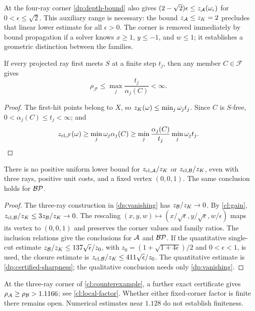 At the four-ray corner \cref{dp:depth-bound} also gives
$(2-\sqrt2)\epsilon\le z_{\mathcal A}(\omega_\epsilon)$ for
$0<\epsilon\le\sqrt2$. This auxiliary range is necessary: the bound
$z_{\mathcal A}\le z_K=2$ precludes that linear lower estimate for all
$\epsilon>0$. The corner is removed immediately by bound propagation
if a solver knows $x\ge1$, $y\le-1$, and $w\le1$; it establishes a
geometric distinction between the families.

\begin{proposition}\label{cl:finite-factor}
If every projected ray first meets $S$ at a finite step $t_j$, then any
member $C\in\mathcal F$ gives
\[
 \rho_{\mathcal F}\le\max_j\frac{t_j}{\alpha_j(C)}<\infty.
\]
\end{proposition}

\begin{proof}
The first-hit points belong to $X$, so
$z_K(\omega)\le\min_j\omega_jt_j$. Since $C$ is $S$-free,
$0<\alpha_j(C)\le t_j<\infty$; and
\[
 z_{\mathrm{cl},\mathcal F}(\omega)
 \ge\min_j\omega_j\alpha_j(C)
 \ge\min_j\frac{\alpha_j(C)}{t_j}\min_j\omega_jt_j.
\]
\end{proof}

\begin{corollary}\label{cl:no-uniform}
There is no positive uniform lower bound for
$z_{\mathrm{cl},\mathcal A}/z_K$ or $z_{\mathrm{cl},\mathcal B}/z_K$, even with
three rays, positive unit costs, and a fixed vertex $(0,0,1)$.
The same conclusion holds for $\mathcal {BP}$.
\end{corollary}

\begin{proof}
The three-ray construction in \cref{dp:vanishing} has
$z_{\mathcal B}/z_K\to0$. By \cref{cl:gain},
$z_{\mathrm{cl},\mathcal B}/z_K\le3z_{\mathcal B}/z_K\to0$.
The rescaling $(x,y,w)\mapsto(x/\sqrt\epsilon,y/\sqrt\epsilon,w/\epsilon)$
maps its vertex to $(0,0,1)$ and preserves the corner values and family
ratios. The inclusion relations give the conclusions for $\mathcal A$ and
$\mathcal {BP}$. If the quantitative single-cut estimate
$z_{\mathcal B}/z_K\le137\sqrt\epsilon/z_0$, with
$z_0=(1+\sqrt{1+4\epsilon})/2$ and $0<\epsilon<1$, is used, the closure
estimate is $z_{\mathrm{cl},\mathcal B}/z_K\le411\sqrt\epsilon/z_0$.
The quantitative estimate is \cref{dp:certified-sharpness};
the qualitative conclusion needs only \cref{dp:vanishing}.
\end{proof}

At the three-ray corner of \cref{cl:counterexample}, a further exact
certificate gives $\rho_{\mathcal A}\ge\rho_{\mathcal B}>1.1166$;
see \cref{cl:local-factor}. Whether either fixed-corner factor is finite
there remains open. Numerical estimates near $1.128$ do not establish
finiteness.

